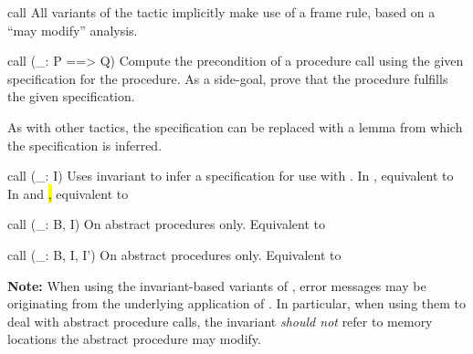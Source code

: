 \begin{tactic}{call}
  All variants of the  tactic implicitly make use of a frame
  rule, based on a ``may modify'' analysis.

  \begin{tsyntax}{call (_: P ==> Q)}
  Compute the precondition of a procedure call using the given
  specification for the procedure. As a side-goal, prove that the
  procedure fulfills the given specification.

  As with other tactics, the specification  can be
  replaced with a lemma from which the specification is inferred.
  \end{tsyntax}

  \begin{tsyntax}{call (_: I)}
  Uses invariant  to infer a specification for use with
  .
  In \prhl, equivalent to
  In \phl and \hl, equivalent to
  \end{tsyntax}

  \begin{tsyntax}{call (_: B, I)}
  On \prhl abstract procedures only.
  Equivalent to 
  \end{tsyntax}

  \begin{tsyntax}{call (_: B, I, I')}
  On \prhl abstract procedures only.
  Equivalent to 
  \end{tsyntax}

  \textbf{Note:} When using the invariant-based variants of
  , error messages may be originating from the underlying
  application of . In particular, when using them to
  deal with abstract procedure calls, the invariant \emph{should not}
  refer to memory locations the abstract procedure may modify.
\end{tactic}
